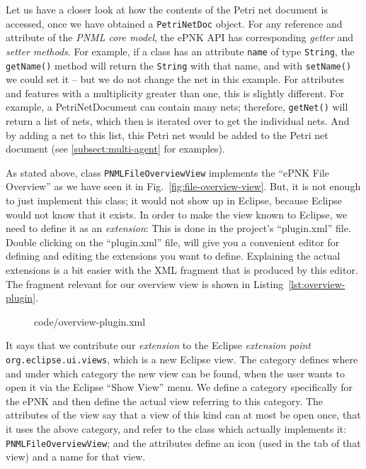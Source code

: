 Let us have a closer look at how the contents of the Petri net
document is accessed, once we have obtained a {\tt PetriNetDoc}
object. For any reference and attribute of the \emph{PNML core model},%
the ePNK API%
has corresponding \emph{getter}%
 and \emph{setter methods}.%
For example, if a class has an attribute {\tt name} of type {\tt String}, the
{\tt getName()} method will return the {\tt String} with that name, and with
{\tt setName()} we could set it -- but we do not change the net in this example.
For attributes and features with a multiplicity greater than one, this is
slightly different. For example, a PetriNetDocument can contain many nets;
therefore, {\tt getNet()} will return a list of nets, which then is
iterated over to get the individual nets. And by adding a net
to this list, this Petri net would be added to the Petri net
document (see \ref{subsect:multi-agent} for examples).

As stated above, class {\tt PNMLFileOverviewView}
implements the ``ePNK File Overview'' as we have seen it in
Fig.~\ref{fig:file-overview-view}. But, it is not enough to just implement
this class; it would not show up in Eclipse, because Eclipse would
not know that it exists. In order to make the view known to
Eclipse, we need to define it as an \emph{extension}:%
This is done in the project's ``plugin.xml''%
file. Double clicking on the
``plugin.xml'' file, will give you a convenient editor for defining and	editing
the extensions you want to define. Explaining the actual extensions is a bit
easier with the XML fragment that is produced by this editor. The
fragment relevant for our overview view is shown in Listing~\ref{lst:overview-plugin}.
%
\begin{figure}[htbp!]
%
  {code/overview-plugin.xml}
\end{figure}
% 
It says that we contribute our \emph{extension}%
to the Eclipse \emph{extension point}%
{\tt org.eclipse.ui.views}, which is a
new Eclipse view. The category defines where and under which category
the new view can be found, when the user wants to open it
via the Eclipse ``Show View'' menu.
We define a category specifically for the ePNK and then define the actual view
referring to this category.
The attributes of the view say that a view of this kind can
at most be open once, that it uses the above category, and refer to the
class which actually implements it: {\tt PNMLFileOverviewView};
and the attributes define an icon (used in the tab of that view) and 
a name for that view.

